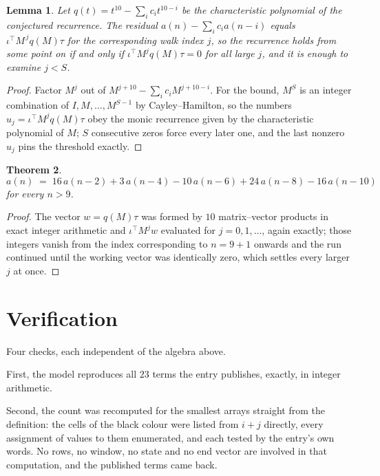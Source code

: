 \documentclass[11pt,a4paper]{article}
\theoremstyle{plain}
\newtheorem{theorem}{Theorem}
\newtheorem{lemma}[theorem]{Lemma}
\theoremstyle{definition}
\begin{document}
\begin{lemma}\label{lem:crit}
Let $q(t)=t^{10}-\sum_i c_it^{10-i}$ be the characteristic polynomial of the
conjectured recurrence. The residual $a(n)-\sum_ic_ia(n-i)$ equals
$\iota^{\!\top}M^{\,j}q(M)\tau$ for the corresponding walk index $j$, so the recurrence
holds from some point on if and only if $\iota^{\!\top}M^{j}q(M)\tau=0$ for all large $j$,
and it is enough to examine $j<S$.
\end{lemma}

\begin{proof}
Factor $M^{j}$ out of $M^{j+10}-\sum_ic_iM^{j+10-i}$. For the bound, $M^{S}$
is an integer combination of $I,M,\dots,M^{S-1}$ by Cayley--Hamilton, so the numbers
$u_j=\iota^{\!\top}M^{j}q(M)\tau$ obey the monic recurrence given by the characteristic
polynomial of $M$; $S$ consecutive zeros force every later one, and the last nonzero $u_j$
pins the threshold exactly.
\end{proof}

\begin{theorem}
\[
a(n)\;=\;16\,a(n-2) + 3\,a(n-4) - 10\,a(n-6) + 24\,a(n-8) - 16\,a(n-10)
\]
for every $n>9$.
\end{theorem}

\begin{proof}
The vector $w=q(M)\tau$ was formed by $10$ matrix--vector products in exact integer
arithmetic and $\iota^{\!\top}M^{j}w$ evaluated for $j=0,1,\dots$, again exactly; those
integers vanish from the index corresponding to $n=9+1$ onwards and the run continued
until the working vector was identically zero, which settles every larger $j$ at once.
\end{proof}

\section{Verification}

Four checks, each independent of the algebra above.

First, the model reproduces all $23$ terms the entry publishes, exactly, in integer
arithmetic.

Second, the count was recomputed for the smallest arrays straight from the definition: the cells
of the black colour were listed from $i+j$ directly, every assignment of values to them
enumerated, and each tested by the entry's own words. No rows, no window, no state and no end
vector are involved in that computation, and the published terms came back.
\end{document}
